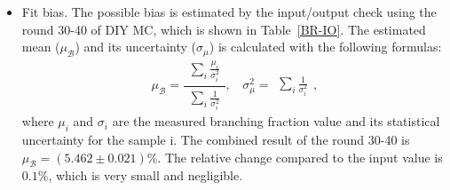 {\begin{itemize}
        \item Fit bias. The possible bias is estimated by the input/output check using the round 30-40 of DIY MC, which is shown in Table~\ref{BR-IO}. 
            The estimated mean ($\mu_{\mathcal{B}}$) and its uncertainty ($\sigma_{\mu}$) is calculated with the following formulas:
            \begin{equation}
            \mu_{\mathcal{B}} = \frac{\begin{matrix}\sum_{i}\frac{\mu_{i}}{\sigma_{i}^{2}}\end{matrix}}{\begin{matrix}\sum_{i}\frac{1}{\sigma_{i}^{2}}\end{matrix}}, \ \ \ \ \sigma_{\mu}^{2}=\begin{matrix}\sum_{i}\frac{1}{\sigma_{i}^{2}}\end{matrix},
            \label{BR-Combined}
            \end{equation}
            where $\mu_{i}$ and $\sigma_{i}$ are the measured branching fraction value and its statistical uncertainty for the sample i. The combined result of the round 30-40 is $\mu_{\mathcal{B}} = (5.462 \pm 0.021)\%$. 
            The relative change compared to the input value is $0.1\%$, which is very small and negligible.


\end{itemize}}
